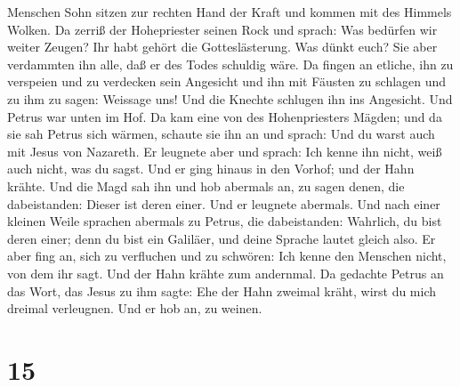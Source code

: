 Menschen Sohn sitzen zur rechten Hand der Kraft und kommen mit des
Himmels Wolken.  Da zerriß der Hohepriester seinen Rock und
sprach: Was bedürfen wir weiter Zeugen?  Ihr habt gehört
die Gotteslästerung. Was dünkt euch? Sie aber verdammten ihn alle, daß
er des Todes schuldig wäre.  Da fingen an etliche, ihn zu
verspeien und zu verdecken sein Angesicht und ihn mit Fäusten zu
schlagen und zu ihm zu sagen: Weissage uns! Und die Knechte schlugen ihn
ins Angesicht.  Und Petrus war unten im Hof. Da kam eine
von des Hohenpriesters Mägden;  und da sie sah Petrus sich
wärmen, schaute sie ihn an und sprach: Und du warst auch mit Jesus von
Nazareth.  Er leugnete aber und sprach: Ich kenne ihn
nicht, weiß auch nicht, was du sagst. Und er ging hinaus in den Vorhof;
und der Hahn krähte.  Und die Magd sah ihn und hob abermals
an, zu sagen denen, die dabeistanden: Dieser ist deren einer.
 Und er leugnete abermals. Und nach einer kleinen Weile
sprachen abermals zu Petrus, die dabeistanden: Wahrlich, du bist deren
einer; denn du bist ein Galiläer, und deine Sprache lautet gleich also.
 Er aber fing an, sich zu verfluchen und zu schwören: Ich
kenne den Menschen nicht, von dem ihr sagt.  Und der Hahn
krähte zum andernmal. Da gedachte Petrus an das Wort, das Jesus zu ihm
sagte: Ehe der Hahn zweimal kräht, wirst du mich dreimal verleugnen. Und
er hob an, zu weinen.

\hypertarget{section-14}{%
\section{15}\label{section-14}}


